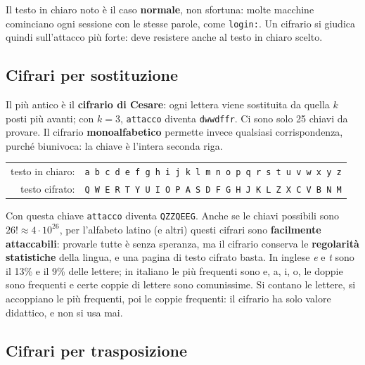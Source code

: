 Il testo in chiaro noto è il caso \textbf{normale}, non sfortuna: molte macchine cominciano ogni sessione con le stesse parole, come
\texttt{login:}. Un cifrario si giudica quindi sull'attacco più forte: deve resistere anche al testo in chiaro scelto.

\subsection{Cifrari per sostituzione}


Il più antico è il \textbf{cifrario di Cesare}: ogni lettera viene sostituita da quella $k$ posti più avanti; con $k = 3$,
\texttt{attacco} diventa \texttt{dwwdffr}. Ci sono solo 25 chiavi da provare. Il cifrario \textbf{monoalfabetico} permette invece
qualsiasi corrispondenza, purché biunivoca: la chiave è l'intera seconda riga.

\begin{center}
\begin{tabular}{rl}
testo in chiaro: & \texttt{a b c d e f g h i j k l m n o p q r s t u v w x y z} \\
testo cifrato: & \texttt{Q W E R T Y U I O P A S D F G H J K L Z X C V B N M} \\
\end{tabular}
\end{center}

Con questa chiave \texttt{attacco} diventa \texttt{QZZQEEG}. Anche se le chiavi possibili sono $26! \approx 4\cdot 10^{26}$, per l'alfabeto
latino (e altri) questi cifrari sono \textbf{facilmente attaccabili}: provarle tutte è senza speranza, ma il cifrario conserva le
\textbf{regolarità statistiche} della lingua, e una pagina di testo cifrato basta. In inglese \emph{e} e \emph{t} sono il 13\% e il 9\%
delle lettere; in italiano le più frequenti sono e, a, i, o, le doppie sono frequenti e certe coppie di lettere sono comunissime. Si
contano le lettere, si accoppiano le più frequenti, poi le coppie frequenti: il cifrario ha solo valore didattico, e non si usa mai.

\subsection{Cifrari per trasposizione}


